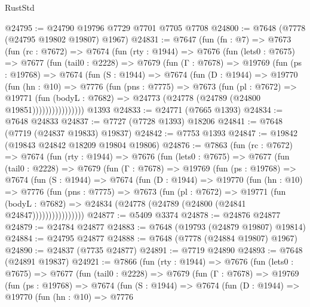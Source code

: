 \begin{lexlean}{RustStd}
\begin{coremodule}
{\begin{coremodule}
{{{{{{{{{{{{{{{{{{{{{{{{{{{{{{{{{{{{{{{{{{{{{{{{{{{{{@24795 := @24790 @19796 @7729 @7701 @7705 @7708
@24800 := @7648 (@7778 (@24795 @19802 @19807) @1967)
@24831 := @7647
    (fun (fn : @7) =>
    @7673
      (fun (rc : @7672) =>
      @7674
        (fun (rty : @1944) =>
        @7676
          (fun (lets0 : @7675) =>
          @7677
            (fun (tail0 : @2228) =>
            @7679
              (fun (Γ : @7678) =>
              @19769
                (fun (ps : @19768) =>
                @7674
                  (fun (S : @1944) =>
                  @7674
                    (fun (D : @1944) =>
                    @19770
                      (fun (hn : @10) =>
                      @7776
                        (fun (pns : @7775) =>
                        @7673
                          (fun (pl : @7672) =>
                          @19771
                            (fun (bodyL : @7682) =>
                            @24773 (@24778 (@24789 (@24800 @19851))))))))))))))))
    @1393
@24833 := @24771 (@7665 @1393)
@24834 := @7648 @24833
@24837 := @7727 (@7728 @1393) @18206
@24841 := @7648 (@7719 (@24837 @19833) @19837)
@24842 := @7753 @1393
@24847 := @19842 (@19843 @24842 @18209 @19804 @19806)
@24876 := @7863
    (fun (rc : @7672) =>
    @7674
      (fun (rty : @1944) =>
      @7676
        (fun (lets0 : @7675) =>
        @7677
          (fun (tail0 : @2228) =>
          @7679
            (fun (Γ : @7678) =>
            @19769
              (fun (ps : @19768) =>
              @7674
                (fun (S : @1944) =>
                @7674
                  (fun (D : @1944) =>
                  @19770
                    (fun (hn : @10) =>
                    @7776
                      (fun (pns : @7775) =>
                      @7673
                        (fun (pl : @7672) =>
                        @19771
                          (fun (bodyL : @7682) =>
                          @24834 (@24778 (@24789 (@24800 (@24841 @24847))))))))))))))))
@24877 := @5409 @3374
@24878 := @24876 @24877
@24879 := @24784 @24877
@24883 := @7648 (@19793 (@24879 @19807) @19814)
@24884 := @24795 @24877
@24888 := @7648 (@7778 (@24884 @19807) @1967)
@24890 := @24837 (@7735 @24877)
@24891 := @7719 @24890
@24893 := @7648 (@24891 @19837)
@24921 := @7866
    (fun (rty : @1944) =>
    @7676
      (fun (lets0 : @7675) =>
      @7677
        (fun (tail0 : @2228) =>
        @7679
          (fun (Γ : @7678) =>
          @19769
            (fun (ps : @19768) =>
            @7674
              (fun (S : @1944) =>
              @7674
                (fun (D : @1944) =>
                @19770
                  (fun (hn : @10) =>
                  @7776
}}}}}}}}}}}}}}}}}}}}}}}}}}}}}}}}}}}}}}}}}}}}}}}}}}}}}
\end{coremodule}}
\end{coremodule}
\end{lexlean}
